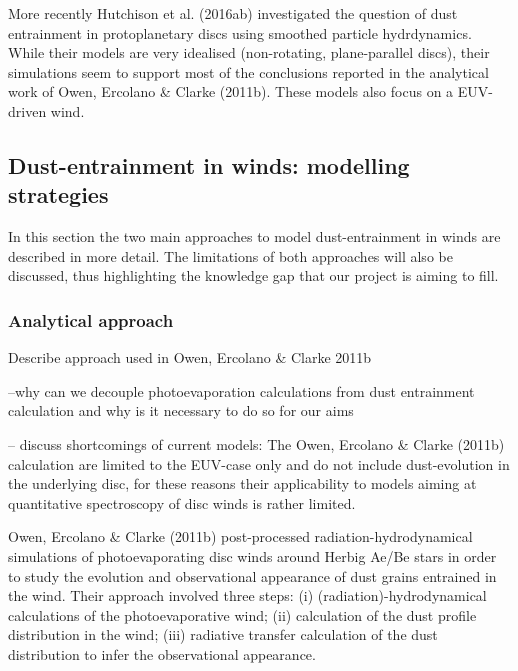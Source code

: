 \documentclass[10pt,fleqn,twoside]{article}
\begin{document}
More recently Hutchison et al. (2016ab) investigated the question of
dust entrainment in protoplanetary discs using smoothed particle
hydrdynamics. While their models are very idealised (non-rotating,
plane-parallel discs), their simulations seem to support most of the
conclusions reported in the analytical work of Owen, Ercolano \&
Clarke (2011b). These models also focus on a EUV-driven wind.  


\subsection{Dust-entrainment in winds: modelling strategies}

In this section the two main approaches to model dust-entrainment in
winds are described in more detail. The limitations of both approaches
will also be discussed, thus highlighting the knowledge gap that our
project is aiming to fill. 

\subsubsection{Analytical approach}\label{sec:analytical_approach}

{\color{red}Describe approach used in Owen, Ercolano \& Clarke 2011b

--why can we decouple photoevaporation calculations from dust
entrainment calculation and why is it necessary to do so for our aims

-- discuss shortcomings of current models: The Owen, Ercolano \& Clarke (2011b) calculation are limited to the EUV-case
only and do not include dust-evolution in the underlying disc, for
these reasons their applicability to models aiming at quantitative
spectroscopy of disc winds is rather limited. 
}

Owen, Ercolano \& Clarke (2011b) post-processed
radiation-hydrodynamical simulations of photoevaporating disc winds
around Herbig Ae/Be stars in order to study the evolution and
observational appearance of dust grains entrained in the wind. Their
approach involved three steps: (i) (radiation)-hydrodynamical
calculations of the photoevaporative wind; (ii) calculation of the
dust profile distribution in the wind; (iii) radiative transfer
calculation of the dust distribution to infer the observational
appearance. 
\end{document}

